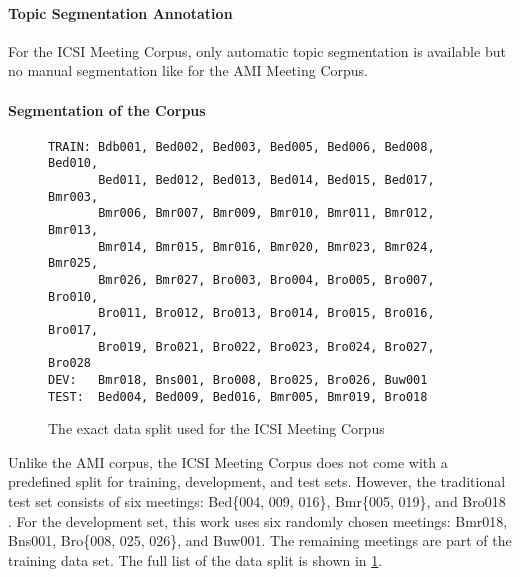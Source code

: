 \paragraph{Topic Segmentation Annotation}

For the ICSI Meeting Corpus, only automatic topic segmentation is available but no manual segmentation like for the AMI Meeting Corpus.

\paragraph{Segmentation of the Corpus}

\begin{figure}[h]
\begin{lstlisting}[numbers=none]
TRAIN: Bdb001, Bed002, Bed003, Bed005, Bed006, Bed008, Bed010,
       Bed011, Bed012, Bed013, Bed014, Bed015, Bed017, Bmr003,
       Bmr006, Bmr007, Bmr009, Bmr010, Bmr011, Bmr012, Bmr013,
       Bmr014, Bmr015, Bmr016, Bmr020, Bmr023, Bmr024, Bmr025, 
       Bmr026, Bmr027, Bro003, Bro004, Bro005, Bro007, Bro010,
       Bro011, Bro012, Bro013, Bro014, Bro015, Bro016, Bro017,
       Bro019, Bro021, Bro022, Bro023, Bro024, Bro027, Bro028
DEV:   Bmr018, Bns001, Bro008, Bro025, Bro026, Buw001
TEST:  Bed004, Bed009, Bed016, Bmr005, Bmr019, Bro018
\end{lstlisting}
\caption{The exact data split used for the ICSI Meeting Corpus}
\label{fig:icsi-split}
\end{figure}

Unlike the AMI corpus, the ICSI Meeting Corpus does not come with a predefined split for training, development, and test sets.
However, the traditional test set consists of six meetings: Bed\{004, 009, 016\}, Bmr\{005, 019\}, and Bro018 \cite{inproceedings}.
For the development set, this work uses six randomly chosen meetings: Bmr018, Bns001, Bro\{008, 025, 026\}, and Buw001.
The remaining meetings are part of the training data set.
The full list of the data split is shown in \cref{fig:icsi-split}.

